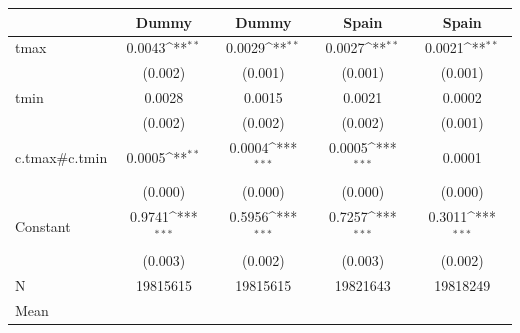 {
\def\sym#1{\ifmmode^{#1}\else\(^{#1}\)\fi}
\begin{tabular}{l*{4}{c}}
\toprule
            &\multicolumn{1}{c}{Dummy}&\multicolumn{1}{c}{Dummy}&\multicolumn{1}{c}{Spain}&\multicolumn{1}{c}{Spain}\\
\midrule
tmax        &      0.0043\sym{**} &      0.0029\sym{**} &      0.0027\sym{**} &      0.0021\sym{**} \\
            &     (0.002)         &     (0.001)         &     (0.001)         &     (0.001)         \\
tmin        &      0.0028         &      0.0015         &      0.0021         &      0.0002         \\
            &     (0.002)         &     (0.002)         &     (0.002)         &     (0.001)         \\
c.tmax#c.tmin&      0.0005\sym{**} &      0.0004\sym{***}&      0.0005\sym{***}&      0.0001         \\
            &     (0.000)         &     (0.000)         &     (0.000)         &     (0.000)         \\
Constant    &      0.9741\sym{***}&      0.5956\sym{***}&      0.7257\sym{***}&      0.3011\sym{***}\\
            &     (0.003)         &     (0.002)         &     (0.003)         &     (0.002)         \\
\midrule
N           &    19815615         &    19815615         &    19821643         &    19818249         \\
Mean        &                     &                     &                     &                     \\
\bottomrule
\end{tabular}
}
